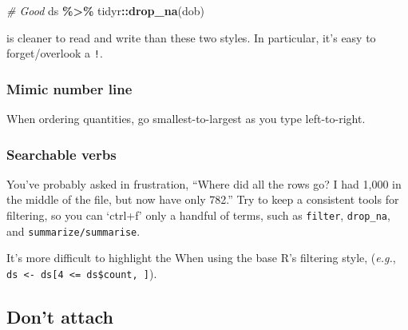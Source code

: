 \documentclass[
]{book}
\newenvironment{Shaded}{\begin{snugshade}}{\end{snugshade}}
\newcommand{\CommentTok}[1]{\textcolor[rgb]{0.56,0.35,0.01}{\textit{#1}}}
\newcommand{\KeywordTok}[1]{\textcolor[rgb]{0.13,0.29,0.53}{\textbf{#1}}}
\newcommand{\NormalTok}[1]{#1}
\newcommand{\OperatorTok}[1]{\textcolor[rgb]{0.81,0.36,0.00}{\textbf{#1}}}
\newcommand{\StringTok}[1]{\textcolor[rgb]{0.31,0.60,0.02}{#1}}
\begin{document}
\begin{Shaded}
\begin{Highlighting}[]
\CommentTok{\# Good}
\NormalTok{ds }\OperatorTok{\%\textgreater{}\%}
\StringTok{  }\NormalTok{tidyr}\OperatorTok{::}\KeywordTok{drop\_na}\NormalTok{(dob)}
\end{Highlighting}
\end{Shaded}

is cleaner to read and write than these two styles. In particular, it's easy to forget/overlook a \texttt{!}.

\begin{Shaded}
\end{Shaded}

\hypertarget{style-filter-number-line}{%
\subsubsection{Mimic number line}\label{style-filter-number-line}}

When ordering quantities, go smallest-to-largest as you type left-to-right.

\hypertarget{style-filter-searchable}{%
\subsubsection{Searchable verbs}\label{style-filter-searchable}}

You've probably asked in frustration, ``Where did all the rows go? I had 1,000 in the middle of the file, but now have only 782.'' Try to keep a consistent tools for filtering, so you can `ctrl+f' only a handful of terms, such as
\texttt{filter},
\texttt{drop\_na}, and
\texttt{summarize/summarise}.

It's more difficult to highlight the When using the base R's filtering style, (\emph{e.g.}, \texttt{ds\ \textless{}-\ ds{[}4\ \textless{}=\ ds\$count,\ {]}}).

\hypertarget{style-attach}{%
\subsection{Don't attach}\label{style-attach}}
\end{document}
